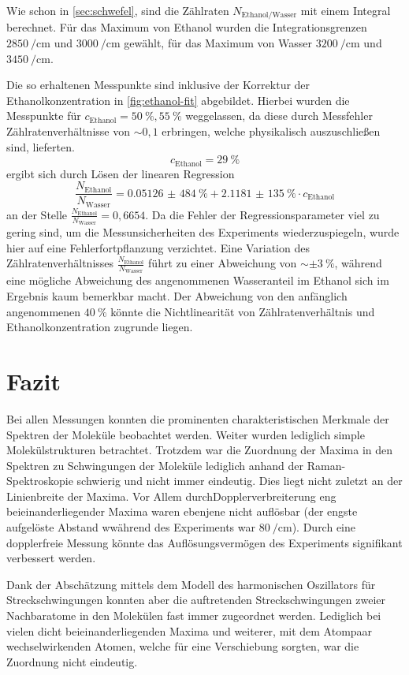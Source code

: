 \documentclass[../bericht.tex]{subfiles}
\begin{document}
    Wie schon in \cref{sec:schwefel}, sind die Zählraten $N_\mathrm{Ethanol/Wasser}$ mit einem Integral berechnet. Für das Maximum von Ethanol wurden die Integrationsgrenzen $\SI{2850}{\per\centi\meter}$ und $\SI{3000}{\per\centi\meter}$ gewählt, für das Maximum von Wasser $\SI{3200}{\per\centi\meter}$ und $\SI{3450}{\per\centi\meter}$.

    Die so erhaltenen Messpunkte sind inklusive der Korrektur der Ethanolkonzentration in \cref{fig:ethanol-fit} abgebildet. Hierbei wurden die Messpunkte für $c_\mathrm{Ethanol}=\SI{50}{\percent}, \SI{55}{\percent}$ weggelassen, da diese durch Messfehler Zählratenverhältnisse von $\sim{0,1}$ erbringen, welche physikalisch auszuschließen sind, lieferten.
    \begin{equation*}
      c_\mathrm{Ethanol}=\SI{29}{\percent}
    \end{equation*}
    ergibt sich durch Lösen der linearen Regression
    \begin{equation*}
      \frac{N_\mathrm{Ethanol}}{N_\mathrm{Wasser}}=\SI{0,05126(484)}{\percent}+\SI{2,1181(135)}{\percent}\cdot c_\mathrm{Ethanol}
    \end{equation*}
    an der Stelle $\frac{N_\mathrm{Ethanol}}{N_\mathrm{Wasser}}=0,6654$. Da die Fehler der Regressionsparameter viel zu gering sind, um die Messunsicherheiten des Experiments wiederzuspiegeln, wurde hier auf eine Fehlerfortpflanzung verzichtet. Eine Variation des Zählratenverhältnisses $\frac{N_\mathrm{Ethanol}}{N_\mathrm{Wasser}}$ führt zu einer Abweichung von $\sim \pm\SI{3}{\percent}$, während eine mögliche Abweichung des angenommenen Wasseranteil im Ethanol sich im Ergebnis kaum bemerkbar macht.
    Der Abweichung von den anfänglich angenommenen $\SI{40}{\percent}$ könnte die Nichtlinearität von Zählratenverhältnis und Ethanolkonzentration zugrunde liegen.


  \section{Fazit}

    Bei allen Messungen konnten die prominenten charakteristischen Merkmale der Spektren der Moleküle beobachtet werden. Weiter wurden lediglich simple Molekülstrukturen betrachtet. Trotzdem war die Zuordnung der Maxima in den Spektren zu Schwingungen der Moleküle lediglich anhand der Raman-Spektroskopie schwierig und nicht immer eindeutig. Dies liegt nicht zuletzt an der Linienbreite der Maxima. Vor Allem durchDopplerverbreiterung eng beieinanderliegender Maxima waren ebenjene nicht auflösbar (der engste aufgelöste Abstand wwährend des Experiments war $\SI{80}{\per\centi\meter}$). Durch eine dopplerfreie Messung könnte das Auflösungsvermögen des Experiments signifikant verbessert werden.

    Dank der Abschätzung mittels dem Modell des harmonischen Oszillators für Streckschwingungen konnten aber die auftretenden Streckschwingungen zweier Nachbaratome in den Molekülen fast immer zugeordnet werden. Lediglich bei vielen dicht beieinanderliegenden Maxima und weiterer, mit dem Atompaar wechselwirkenden Atomen, welche für eine Verschiebung sorgten, war die Zuordnung nicht eindeutig.
\end{document}
